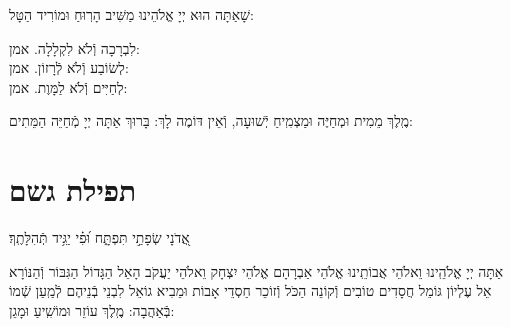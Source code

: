 \documentclass[twoside, openany, parskip=half, 11pt]{book}
\begin{document}
\enlargethispage{\baselineskip}


\begin{large}
	שָׁאַתָּה הוּא יְיָ אֱלֹהֵינוּ מַשִּׁיב הָרֽוּחַ וּמוֹרִיד הַטָּל:
	
	לִבְרָכָה וְֿלֹא לִקְלָלָה. \hfill אמן:\\
	לְשׂוֹבַע וְֿלֹא לְֿרָזוֹן. \hfill אמן:\\
	לְחַיִּים וְֿלֹא לַמָּוֶת. \hfill אמן:
	
\end{large}


מֶֽלֶךְ מֵמִית וּמְחַיֶּה וּמַצְמִֽיחַ יְֿשׁוּעָה, וְֿאֵין דּוֹמֶה לָךְ: בָּרוּךְ אַתָּה יְיָ מְֿחַיֵּה הַמֵּתִים:





\section[תפילת גשם]{ תפילת גשם }

\label{tefilasgeshem}


\begin{small}
	אֲ֭דֹנָי שְׂפָתַ֣י תִּפְתָּ֑ח וּ֝פִ֗י יַגִּ֥יד תְּֿהִלָּתֶֽךָ׃\\
\end{small}
אַתָּה יְיָ אֱלֹהֵֽינוּ וֵאלֹהֵי אֲבוֹתֵֽינוּ אֱלֹהֵי אַבְרָהָם אֱלֹהֵי יִצְחָק וֵאלֹהֵי יַעֲקֹב הָאֵל הַגָּדוֹל הַגִּבּוֹר וְֿהַנּוֹרָא אֵל עֶלְיוֹן גּוֹמֵל חֲסָדִים טוֹבִים וְֿקוֹנֵה הַכֹּל וְֿזוֹכֵר חַסְדֵי אָבוֹת וּמֵבִיא גוֹאֵל לִבְנֵי בְֿנֵיהֶם לְֿמַֽעַן שְֿׁמוֹ בְּֿאַהֲבָה: מֶֽלֶךְ עוֹזֵר וּמוֹשִֽׁיעַ וּמָגֵן:

\newenvironment{nstabbing}
{\setlength{\topsep}{0pt}%
	\setlength{\partopsep}{0pt}%
	\tabbing}
{\endtabbing}

\end{document}
